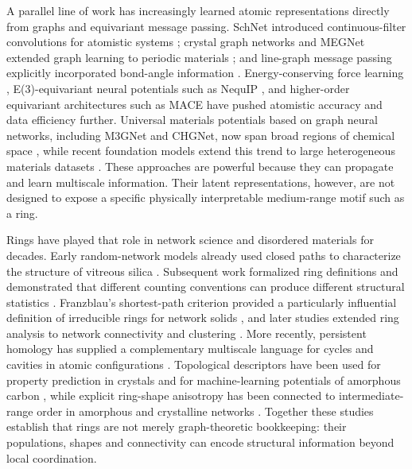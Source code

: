 \documentclass[twoside,twocolumn,9pt]{article}
\begin{document}
A parallel line of work has increasingly learned atomic representations directly from graphs and equivariant message passing. SchNet introduced continuous-filter convolutions for atomistic systems \cite{Schutt2018}; crystal graph networks and MEGNet extended graph learning to periodic materials \cite{Xie2018,Chen2019}; and line-graph message passing explicitly incorporated bond-angle information \cite{Choudhary2021}. Energy-conserving force learning \cite{Chmiela2017}, E(3)-equivariant neural potentials such as NequIP \cite{Batzner2022}, and higher-order equivariant architectures such as MACE \cite{Batatia2022} have pushed atomistic accuracy and data efficiency further. Universal materials potentials based on graph neural networks, including M3GNet and CHGNet, now span broad regions of chemical space \cite{ChenOng2022,Deng2023}, while recent foundation models extend this trend to large heterogeneous materials datasets \cite{Batatia2025}. These approaches are powerful because they can propagate and learn multiscale information. Their latent representations, however, are not designed to expose a specific physically interpretable medium-range motif such as a ring.

Rings have played that role in network science and disordered materials for decades. Early random-network models already used closed paths to characterize the structure of vitreous silica \cite{BellDean1966,King1967}. Subsequent work formalized ring definitions and demonstrated that different counting conventions can produce different structural statistics \cite{Guttman1990}. Franzblau's shortest-path criterion provided a particularly influential definition of irreducible rings for network solids \cite{Franzblau1991}, and later studies extended ring analysis to network connectivity and clustering \cite{LeRoux2010,Jain2007}. More recently, persistent homology has supplied a complementary multiscale language for cycles and cavities in atomic configurations \cite{Hiraoka2016,Morley2021}. Topological descriptors have been used for property prediction in crystals \cite{Jiang2021} and for machine-learning potentials of amorphous carbon \cite{Minamitani2023}, while explicit ring-shape anisotropy has been connected to intermediate-range order in amorphous and crystalline networks \cite{Shiga2023}. Together these studies establish that rings are not merely graph-theoretic bookkeeping: their populations, shapes and connectivity can encode structural information beyond local coordination.
\end{document}
